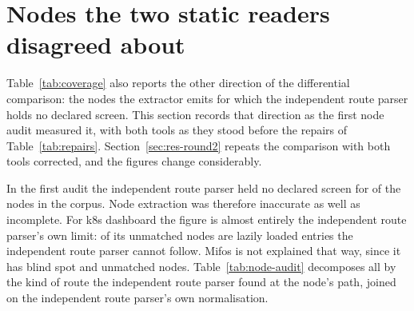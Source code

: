 \section{Nodes the two static readers disagreed about}
\label{app:readers}

Table~\ref{tab:coverage} also reports the other direction of the differential comparison: the nodes the extractor emits for which the independent route parser holds no declared screen. This section records that direction as the first node audit measured it, with both tools as they stood before the repairs of Table~\ref{tab:repairs}. Section~\ref{sec:res-round2} repeats the comparison with both tools corrected, and the figures change considerably.

In the first audit the independent route parser held no declared screen for \NodeAuditUnmatchedAll{} of the \NodeAuditGraphNodesAll{} nodes in the corpus. Node extraction was therefore inaccurate as well as incomplete. For k8s dashboard the figure is almost entirely the independent route parser's own limit: \NodeAuditBlindKdash{} of its \NodeAuditUnmatchedKdash{} unmatched nodes are lazily loaded entries the independent route parser cannot follow. Mifos is not explained that way, since it has \NodeAuditBlindSpotsMifos{} blind spot and \NodeAuditUnmatchedMifos{} unmatched nodes. Table~\ref{tab:node-audit} decomposes all \NodeAuditUnmatchedAll{} by the kind of route the independent route parser found at the node's path, joined on the independent route parser's own normalisation.

\begin{table}[t]\footnotesize
\caption{Why each unmatched node has no declared screen, as the first node audit measured it
(Table~\ref{tab:provenance}). A node is placed in the first row that applies, and the categories
are exclusive.}
\label{tab:node-audit}
\TabNodeAudit
\end{table}

